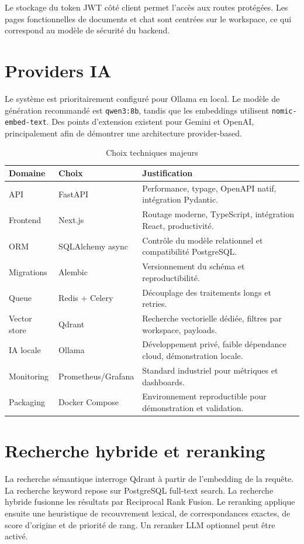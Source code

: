 \documentclass[12pt,a4paper,oneside]{report}
\begin{document}
Le stockage du token JWT côté client permet l'accès aux routes protégées. Les pages fonctionnelles de documents et chat sont centrées sur le workspace, ce qui correspond au modèle de sécurité du backend.

\section{Providers IA}
Le système est prioritairement configuré pour Ollama en local. Le modèle de génération recommandé est \texttt{qwen3:8b}, tandis que les embeddings utilisent \texttt{nomic-embed-text}. Des points d'extension existent pour Gemini et OpenAI, principalement afin de démontrer une architecture provider-based.

\begin{table}[H]
  \centering
  \caption{Choix techniques majeurs}
  \begin{tabularx}{\textwidth}{L{3cm}L{3.2cm}Y}
    \toprule
    \textbf{Domaine} & \textbf{Choix} & \textbf{Justification} \\
    \midrule
    API & FastAPI & Performance, typage, OpenAPI natif, intégration Pydantic. \\
    Frontend & Next.js & Routage moderne, TypeScript, intégration React, productivité. \\
    ORM & SQLAlchemy async & Contrôle du modèle relationnel et compatibilité PostgreSQL. \\
    Migrations & Alembic & Versionnement du schéma et reproductibilité. \\
    Queue & Redis + Celery & Découplage des traitements longs et retries. \\
    Vector store & Qdrant & Recherche vectorielle dédiée, filtres par workspace, payloads. \\
    IA locale & Ollama & Développement privé, faible dépendance cloud, démonstration locale. \\
    Monitoring & Prometheus/Grafana & Standard industriel pour métriques et dashboards. \\
    Packaging & Docker Compose & Environnement reproductible pour démonstration et validation. \\
    \bottomrule
  \end{tabularx}
\end{table}

\section{Recherche hybride et reranking}
La recherche sémantique interroge Qdrant à partir de l'embedding de la requête. La recherche keyword repose sur PostgreSQL full-text search. La recherche hybride fusionne les résultats par Reciprocal Rank Fusion. Le reranking applique ensuite une heuristique de recouvrement lexical, de correspondances exactes, de score d'origine et de priorité de rang. Un reranker LLM optionnel peut être activé.
\end{document}
